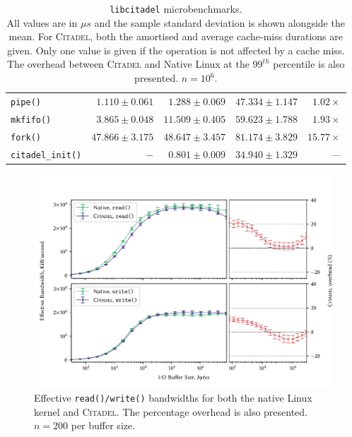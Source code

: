 \begin{table}
{\begin{tabular}{l@{\hskip 0.15in} r@{\hskip 0.4in} r@{\hskip 0.35in} r@{\hskip 0.15in} r}
        \midrule 
        \texttt{pipe()} & $1.110\pm0.061$ & $1.288\pm0.069$ & $47.334\pm1.147$ & $1.02\times$\\
        \texttt{mkfifo()} & $3.865\pm0.048$ & $11.509\pm0.405$ & $59.623\pm1.788$ & $1.93\times$\\

        \midrule 
        \texttt{fork()} & $47.866\pm3.175$ & $48.647\pm3.457$ & $81.174\pm3.829$ & $15.77\times$\\
        \texttt{citadel\_init()} & $-$ & $0.801\pm0.009$ & $34.940\pm1.329$ & ---\\
        \bottomrule
    \end{tabular}
    }
    \vspace{5mm}
    \captionsetup{justification=centering}
    \caption[\texttt{libcitadel} microbenchmarks]{\texttt{libcitadel} microbenchmarks. \\ All values are in $\mu s$ and the sample standard deviation is shown alongside the mean. For \textsc{Citadel}, both the amortised and average cache-miss durations are given. Only one value is given if the operation is not affected by a cache miss. The overhead between \textsc{Citadel} and Native Linux at the $99^{th}$ percentile is also presented. $n=10^6$.}
    \label{table:syscall-microbenchmarks}
\end{table}

\begin{figure}[h]
    \centering
    \includegraphics[width=\linewidth]{figures/graphs/io.pdf}
    \vspace{-5mm}
    \captionsetup{justification=centering}
    \caption[Effective \texttt{read()/write()} bandwidths for both the native Linux kernel and \textsc{Citadel}.]{Effective \texttt{read()/write()} bandwidths for both the native Linux kernel and \textsc{Citadel}. The percentage overhead is also presented. $n=200$ per buffer size.}
    \label{fig:io-graph}
\end{figure}

